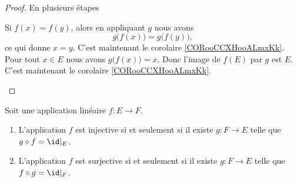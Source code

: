 \begin{proof}
	En plusieurs étapes
	\begin{subproof}
		Si \( f(x)=f(y)\), alors en appliquant \( g\) nous avons
		\begin{equation}
			g\big( f(x) \big)=g\big( f(y) \big),
		\end{equation}
		ce qui donne \( x=y\).
		C'est maintenant le corolaire \ref{CORooCCXHooALmxKk}.
		Pour tout \( x\in E\) nous avons \( g\big( f(x) \big)=x\). Donc l'image de \( f(E)\) par \( g\) est \( E\).
		C'est maintenant le corolaire \ref{CORooCCXHooALmxKk}.
	\end{subproof}
\end{proof}

\begin{lemma}        \label{LEMooDAACooElDsYb}
	Soit une application linéaire \( f\colon E\to F\).
	\begin{enumerate}
		\item       \label{ITEMooEZEWooZGoqsZ}
		      L'application \( f\) est injective si et seulement si il existe \( g\colon F\to E\) telle que \( g\circ f=\id|_E\).
		\item
		      L'application \( f\) est surjective si et seulement si il existe \( g\colon F\to E\) telle que \( f\circ g=\id|_F\).
	\end{enumerate}
\end{lemma}

